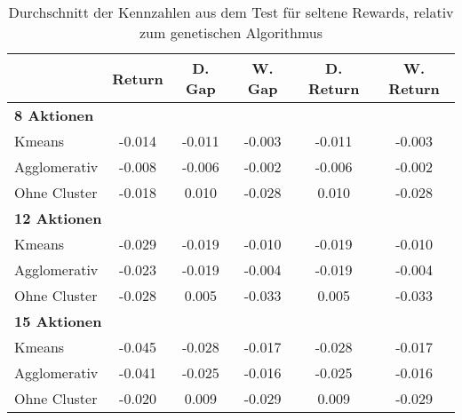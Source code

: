 \begin{table}[ht]
\centering
\caption{Durchschnitt der Kennzahlen aus dem Test für seltene Rewards, relativ zum genetischen Algorithmus}
\begin{tabular}{lccccc}
\hline
\textbf{} & \textbf{Return} & \textbf{D. Gap} & \textbf{W. Gap} & \textbf{D. Return} & \textbf{W. Return} \\
\hline
\multicolumn{6}{l}{\textbf{8 Aktionen}} \\
\hspace{1em}Kmeans & -0.014 & -0.011 & -0.003 & -0.011 & -0.003 \\
\hspace{1em}Agglomerativ & -0.008 & -0.006 & -0.002 & -0.006 & -0.002 \\
\hspace{1em}Ohne Cluster & -0.018 & 0.010 & -0.028 & 0.010 & -0.028 \\
\hline
\multicolumn{6}{l}{\textbf{12 Aktionen}} \\
\hspace{1em}Kmeans & -0.029 & -0.019 & -0.010 & -0.019 & -0.010 \\
\hspace{1em}Agglomerativ & -0.023 & -0.019 & -0.004 & -0.019 & -0.004 \\
\hspace{1em}Ohne Cluster & -0.028 & 0.005 & -0.033 & 0.005 & -0.033 \\
\hline
\multicolumn{6}{l}{\textbf{15 Aktionen}} \\
\hspace{1em}Kmeans & -0.045 & -0.028 & -0.017 & -0.028 & -0.017 \\
\hspace{1em}Agglomerativ & -0.041 & -0.025 & -0.016 & -0.025 & -0.016 \\
\hspace{1em}Ohne Cluster & -0.020 & 0.009 & -0.029 & 0.009 & -0.029 \\
\hline
\end{tabular}
\end{table}


